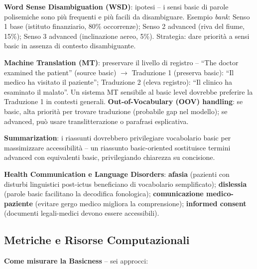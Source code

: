 \documentclass[12pt,a4paper]{article}
\begin{document}
\textbf{Word Sense Disambiguation (WSD)}: ipotesi -- i sensi basic di parole polisemiche sono pi\`u frequenti e pi\`u facili da disambiguare. Esempio \textit{bank}: Senso 1 base (istituto finanziario, 80\% occorrenze); Senso 2 advanced (riva del fiume, 15\%); Senso 3 advanced (inclinazione aereo, 5\%). Strategia: dare priorit\`a a sensi basic in assenza di contesto disambiguante.

\textbf{Machine Translation (MT)}: preservare il livello di registro -- ``The doctor examined the patient'' (source basic) $\to$ Traduzione 1 (preserva basic): ``Il medico ha visitato il paziente''; Traduzione 2 (eleva registro): ``Il clinico ha esaminato il malato''. Un sistema MT sensibile al basic level dovrebbe preferire la Traduzione 1 in contesti generali. \textbf{Out-of-Vocabulary (OOV) handling}: se basic, alta priorit\`a per trovare traduzione (probabile gap nel modello); se advanced, pu\`o usare translitterazione o parafrasi esplicativa.

\textbf{Summarization}: i riassunti dovrebbero privilegiare vocabolario basic per massimizzare accessibilit\`a -- un riassunto basic-oriented sostituisce termini advanced con equivalenti basic, privilegiando chiarezza su concisione.

\textbf{Health Communication e Language Disorders}: \textbf{afasia} (pazienti con disturbi linguistici post-ictus beneficiano di vocabolario semplificato); \textbf{dislessia} (parole basic facilitano la decodifica fonologica); \textbf{comunicazione medico-paziente} (evitare gergo medico migliora la comprensione); \textbf{informed consent} (documenti legali-medici devono essere accessibili).

\subsection{Metriche e Risorse Computazionali}

\textbf{Come misurare la Basicness} -- sei approcci:
\end{document}
